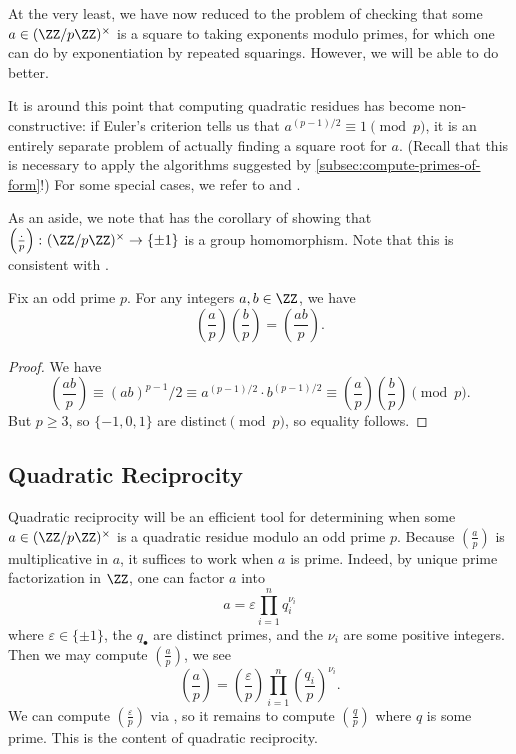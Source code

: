 \documentclass[../notes.tex]{subfiles}
\begin{document}
At the very least, we have now reduced to the problem of checking that some $a\in(\ZZ/p\ZZ)^\times$ is a square to taking exponents modulo primes, for which one can do by exponentiation by repeated squarings. However, we will be able to do better.
\begin{remark}
	It is around this point that computing quadratic residues has become non-constructive: if Euler's criterion tells us that $a^{(p-1)/2}\equiv1\pmod p$, it is an entirely separate problem of actually finding a square root for $a$. (Recall that this is necessary to apply the algorithms suggested by \cref{subsec:compute-primes-of-form}!) For some special cases, we refer to  and .
\end{remark}
As an aside, we note that  has the corollary of showing that $\left(\frac\cdot p\right)\colon(\ZZ/p\ZZ)^\times\to\{\pm1\}$ is a group homomorphism. Note that this is consistent with .
\begin{corollary} \label{cor:leg-symbol-is-char}
	Fix an odd prime $p$. For any integers $a,b\in\ZZ$, we have
	\[\left(\frac ap\right)\left(\frac bp\right)=\left(\frac{ab}p\right).\]
\end{corollary}
\begin{proof}
	We have
	\[\left(\frac{ab}p\right)\equiv(ab)^{p-1}/2\equiv a^{(p-1)/2}\cdot b^{(p-1)/2}\equiv\left(\frac ap\right)\left(\frac bp\right)\pmod p.\]
	But $p\ge3$, so $\{-1,0,1\}$ are distinct$\pmod p$, so equality follows.
\end{proof}

\subsection{Quadratic Reciprocity}
Quadratic reciprocity will be an efficient tool for determining when some $a\in(\ZZ/p\ZZ)^\times$ is a quadratic residue modulo an odd prime $p$. Because $\left(\frac ap\right)$ is multiplicative in $a$, it suffices to work when $a$ is prime. Indeed, by unique prime factorization in $\ZZ$, one can factor $a$ into
\[a=\varepsilon\prod_{i=1}^nq_i^{\nu_i}\]
where $\varepsilon\in\{\pm1\}$, the $q_\bullet$ are distinct primes, and the $\nu_i$ are some positive integers. Then we may compute $\left(\frac ap\right)$, we see
\[\left(\frac ap\right)=\left(\frac\varepsilon p\right)\prod_{i=1}^n\left(\frac{q_i}p\right)^{\nu_i}.\]
We can compute $\left(\frac\varepsilon p\right)$ via , so it remains to compute $\left(\frac qp\right)$ where $q$ is some prime. This is the content of quadratic reciprocity.
\end{document}
